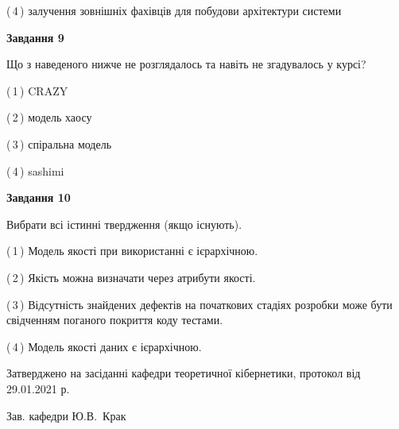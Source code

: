 \documentclass[10pt, ukrainian]{article}
\begin{document}
{\begin {large}
(\,4\,) залучення зовнішніх фахівців для побудови архітектури системи%


{\begin {center}\textbf{Завдання 9}\end {center}}\par
Що з наведеного нижче не розглядалось та навіть не згадувалось у курсі?\par
\vspace{2mm}



(\,1\,) CRAZY%



(\,2\,) модель хаосу%



(\,3\,) спіральна модель%



(\,4\,) sashimi%


{\begin {center}\textbf{Завдання 10}\end {center}}\par
Вибрати всі істинні твердження (якщо існують).\par
\vspace{2mm}



(\,1\,) Модель якості при використанні є ієрархічною.%



(\,2\,) Якість можна визначати через атрибути якості.%



(\,3\,) Відсутність знайдених дефектів на початкових стадіях розробки може бути свідченням поганого покриття коду тестами.%



(\,4\,) Модель якості даних є ієрархічною.%



\end {large}}
{\vspace{5mm}\smallskip \begin {small} Затверджено на засіданні кафедри теоретичної кібернетики, протокол  від   29.01.2021 р.\par\smallskip\smallskip
{\parbox {6.5 cm}{Зав. кафедри \dotfill Ю.В.~Крак}} \end{small}}
\newpage
\end{document}
